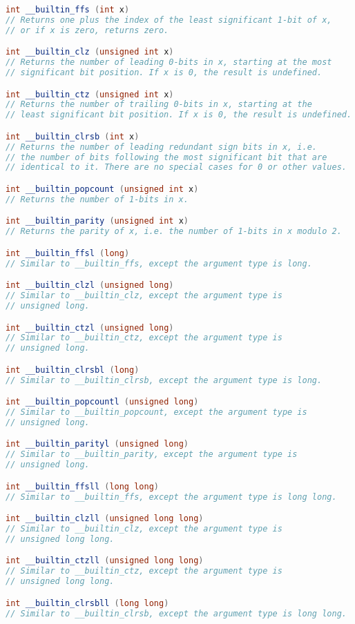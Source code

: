 \documentclass[12pt,a4paper,twoside]{report}
\begin{document}
\noindent\begin{lstlisting}[caption=Builtins,language=C++]
int __builtin_ffs (int x)
// Returns one plus the index of the least significant 1-bit of x,
// or if x is zero, returns zero.

int __builtin_clz (unsigned int x)
// Returns the number of leading 0-bits in x, starting at the most
// significant bit position. If x is 0, the result is undefined.

int __builtin_ctz (unsigned int x)
// Returns the number of trailing 0-bits in x, starting at the 
// least significant bit position. If x is 0, the result is undefined.

int __builtin_clrsb (int x)
// Returns the number of leading redundant sign bits in x, i.e. 
// the number of bits following the most significant bit that are 
// identical to it. There are no special cases for 0 or other values.

int __builtin_popcount (unsigned int x)
// Returns the number of 1-bits in x.

int __builtin_parity (unsigned int x)
// Returns the parity of x, i.e. the number of 1-bits in x modulo 2.

int __builtin_ffsl (long)
// Similar to __builtin_ffs, except the argument type is long.

int __builtin_clzl (unsigned long)
// Similar to __builtin_clz, except the argument type is 
// unsigned long.

int __builtin_ctzl (unsigned long)
// Similar to __builtin_ctz, except the argument type is 
// unsigned long.

int __builtin_clrsbl (long)
// Similar to __builtin_clrsb, except the argument type is long.

int __builtin_popcountl (unsigned long)
// Similar to __builtin_popcount, except the argument type is 
// unsigned long.

int __builtin_parityl (unsigned long)
// Similar to __builtin_parity, except the argument type is 
// unsigned long.

int __builtin_ffsll (long long)
// Similar to __builtin_ffs, except the argument type is long long.

int __builtin_clzll (unsigned long long)
// Similar to __builtin_clz, except the argument type is 
// unsigned long long.

int __builtin_ctzll (unsigned long long)
// Similar to __builtin_ctz, except the argument type is 
// unsigned long long.

int __builtin_clrsbll (long long)
// Similar to __builtin_clrsb, except the argument type is long long.


\end{lstlisting}
\end{document}
